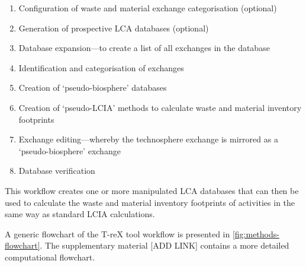 \begin{enumerate}
    \item Configuration of waste and material exchange categorisation (optional)
    \item Generation of prospective LCA databases (optional)
    \item Database expansion---to create a list of all exchanges in the database
    \item Identification and categorisation of exchanges
    \item Creation of `pseudo-biosphere' databases
    \item Creation of `pseudo-LCIA' methods to calculate waste and material inventory footprints
    \item Exchange editing---whereby the technosphere exchange is mirrored as a `pseudo-biosphere' exchange
    \item Database verification
\end{enumerate}

This workflow creates one or more manipulated LCA databases that can then be used to calculate the waste and material inventory footprints of activities in the same way as standard LCIA calculations.

A generic flowchart of the T-reX tool workflow is presented in \autoref{fig:methods-flowchart}. The supplementary material [ADD LINK] contains a more detailed computational flowchart.


